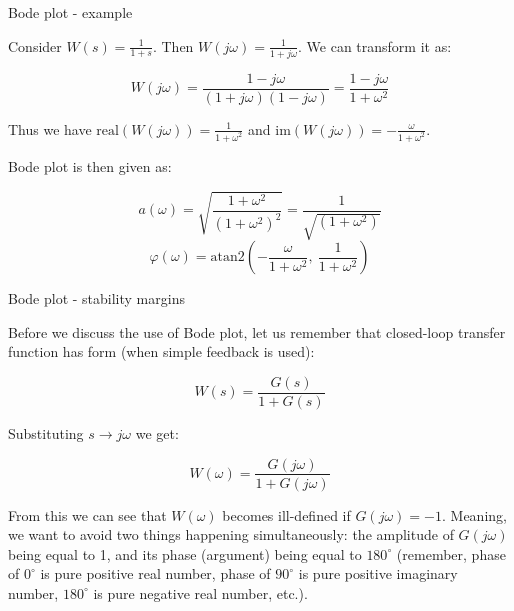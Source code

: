 \documentclass{beamer}
\newcommand{\degree}{^{\circ}}
\begin{document}
\begin{frame}{Bode plot - example}
\begin{flushleft}

Consider $W(s) = \frac{1}{1 + s}$. Then $W(j \omega) = \frac{1}{1 + j \omega}$. We can transform it as:

\begin{equation}
    W(j \omega) = \frac{1 - j \omega}{(1 + j \omega)(1 - j \omega)} = 
    \frac{1 - j \omega}{1 + \omega^2}
\end{equation}

Thus we have $\text{real}(W(j \omega)) = \frac{1}{1 + \omega^2}$ and $\text{im}(W(j \omega)) = - \frac{\omega}{1 + \omega^2}$.

\bigskip
 
Bode plot is then given as:

\begin{equation}
   a(\omega) = \sqrt{\frac{1 + \omega^2}{(1 + \omega^2)^2}} = 
   \frac{1}{\sqrt{(1 + \omega^2)}}
\end{equation}
\begin{equation}
   \varphi(\omega) = \text{atan2} \left(-\frac{\omega}{1 + \omega^2}, \ \frac{1}{1 + \omega^2} \right)
\end{equation}

\end{flushleft}
\end{frame}





\begin{frame}{Bode plot - stability margins}
\begin{flushleft}

Before we discuss the use of Bode plot, let us remember that closed-loop transfer function has form (when simple feedback is used):

\begin{equation}
    W(s) = \frac{G(s)}{1 + G(s)}
\end{equation}

Substituting $s \longrightarrow j \omega$ we get:

\begin{equation}
    W(\omega) = \frac{G(j \omega)}{1 + G(j \omega)}
\end{equation}

From this we can see that $W(\omega)$ becomes ill-defined if $G(j \omega) = -1$. Meaning, we want to avoid two things happening simultaneously: the amplitude of $G(j \omega)$ being equal to 1, and its phase (argument) being equal to $180\degree$ (remember, phase of $0\degree$ is pure positive real number, phase of $90\degree$ is pure positive imaginary number, $180\degree$ is pure negative real number, etc.).

\end{flushleft}
\end{frame}
\end{document}
